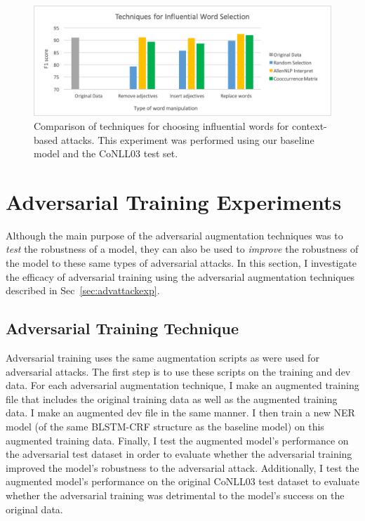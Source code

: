  \begin{figure}[h]
	\centering
	\includegraphics[width=0.85\linewidth]{LatexDiss/figures/influentialwords.png}
	\caption{Comparison of techniques for choosing influential words for context-based attacks. This experiment was performed using our baseline model and the CoNLL03 test set.}
	\label{fig:influentialwords}
\end{figure}

\section{Adversarial Training Experiments}
Although the main purpose of the adversarial augmentation techniques was to \textit{test} the robustness of a model, they can also be used to \textit{improve} the robustness of the model to these same types of adversarial attacks. In this section, I investigate the efficacy of adversarial training using the adversarial augmentation techniques described in Sec~\ref{sec:advattackexp}. 

\subsection{Adversarial Training Technique}
Adversarial training uses the same augmentation scripts as were used for adversarial attacks. The first step is to use these scripts on the training and dev data. For each adversarial augmentation technique, I make an augmented training file that includes the original training data as well as the augmented training data. I make an augmented dev file in the same manner. I then train a new NER model (of the same BLSTM-CRF structure as the baseline model) on this augmented training data. Finally, I test the augmented model's performance on the adversarial test dataset in order to evaluate whether the adversarial training improved the model's robustness to the adversarial attack. Additionally, I test the augmented model's performance on the original CoNLL03 test dataset to evaluate whether the adversarial training was detrimental to the model's success on the original data.

